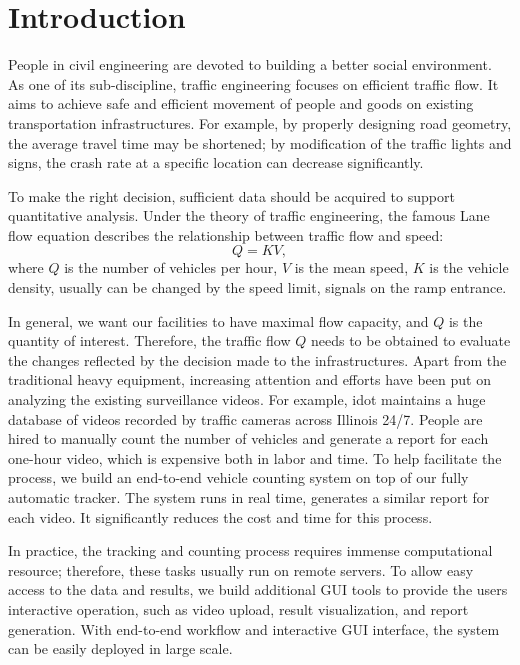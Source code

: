 \section{Introduction}
\label{sec:sys-intro}

People in civil engineering are devoted to building a better social environment.
As one of its sub-discipline, traffic engineering focuses on efficient traffic flow. 
It aims to achieve safe and efficient movement of people and goods on existing transportation infrastructures. 
For example, by properly designing road geometry, the average travel time may be shortened; 
by modification of the traffic lights and signs, the crash rate at a specific location can decrease significantly.

To make the right decision, sufficient data should be acquired to support quantitative analysis.
Under the theory of traffic engineering, the famous Lane flow equation \cite{roess2004traffic} describes the relationship between traffic flow and speed:
$$Q = KV,$$
where $Q$ is the number of vehicles per hour, $V$ is the mean speed, $K$ is the vehicle density, usually can be changed by the speed limit, signals on the ramp entrance. 

In general, we want our facilities to have maximal flow capacity, and $Q$ is the quantity of interest.
Therefore, the traffic flow $Q$ needs to be obtained to evaluate the changes reflected by the decision made to the infrastructures.
Apart from the traditional heavy equipment, increasing attention and efforts have been put on analyzing the existing surveillance videos.
For example, \gls{idot} maintains a huge database of videos recorded by traffic cameras across Illinois 24/7. 
People are hired to manually count the number of vehicles and generate a report for each one-hour video, which is expensive both in labor and time.
To help facilitate the process, we build an end-to-end vehicle counting system on top of our fully automatic tracker. 
The system runs in real time, generates a similar report for each video. It significantly reduces the cost and time for this process.

In practice, the tracking and counting process requires immense computational resource; therefore, these tasks usually run on remote servers. 
To allow easy access to the data and results, we build additional GUI tools to provide the users interactive operation, such as video upload, result visualization, and report generation.
With end-to-end workflow and interactive GUI interface, the system can be easily deployed in large scale.